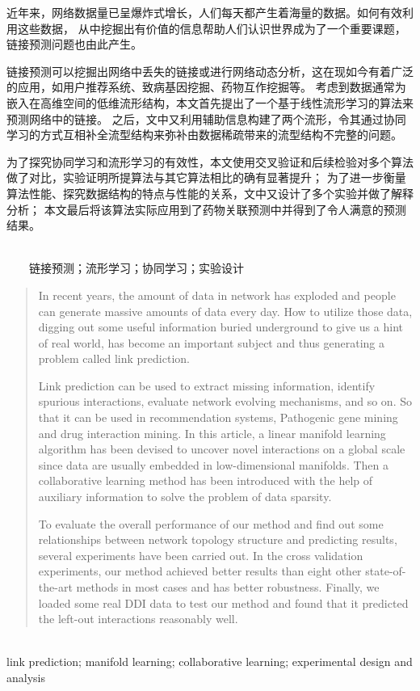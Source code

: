 

\begin{zhaiyao}

近年来，网络数据量已呈爆炸式增长，人们每天都产生着海量的数据。如何有效利用这些数据，
从中挖掘出有价值的信息帮助人们认识世界成为了一个重要课题，链接预测问题也由此产生。


链接预测可以挖掘出网络中丢失的链接或进行网络动态分析，这在现如今有着广泛的应用，如用户推荐系统、致病基因挖掘、药物互作挖掘等。
考虑到数据通常为嵌入在高维空间的低维流形结构，本文首先提出了一个基于线性流形学习的算法来预测网络中的链接。
之后，文中又利用辅助信息构建了两个流形，令其通过协同学习的方式互相补全流型结构来弥补由数据稀疏带来的流型结构不完整的问题。


为了探究协同学习和流形学习的有效性，本文使用交叉验证和后续检验对多个算法做了对比，实验证明所提算法与其它算法相比的确有显著提升；
为了进一步衡量算法性能、探究数据结构的特点与性能的关系，文中又设计了多个实验并做了解释分析；
本文最后将该算法实际应用到了药物关联预测中并得到了令人满意的预测结果。
\end{zhaiyao}


\vspace{150pt}

\begin{guanjianci}
\\ \ \ \ \ 链接预测；流形学习；协同学习；实验设计
\end{guanjianci}



\begin{abstract}


In recent years, the amount of data in network has exploded and people can generate massive amounts of data every day. 
How to utilize those data, digging out some useful information buried underground to give us a hint of real world, 
has become an important subject and thus generating a problem called link prediction.


Link prediction can be used to extract missing information, identify spurious interactions, evaluate network evolving mechanisms, and so on. 
So that it can be used in recommendation systems, Pathogenic gene mining and drug interaction mining. 
In this article, a linear manifold learning algorithm has been devised to uncover novel interactions on a global scale 
since data are usually embedded in low-dimensional manifolds. Then a collaborative learning method has been introduced 
with the help of auxiliary information to solve the problem of data sparsity.


To evaluate the overall performance of our method and find out some relationships between network topology structure 
and predicting results, several experiments have been carried out. In the cross validation experiments, 
our method achieved better results than eight other state-of-the-art methods in most cases and has better robustness. 
Finally, we loaded some real DDI data to test our method and found that it predicted the left-out interactions reasonably well.

\end{abstract}


\vspace{100pt}


\begin{keywords}
\\ link prediction; manifold learning; collaborative learning; experimental design and analysis
\end{keywords} 